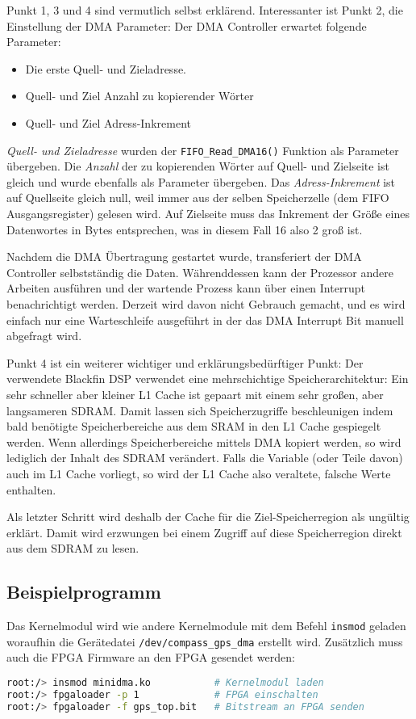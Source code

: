 Punkt 1, 3 und 4 sind vermutlich selbst erklärend. Interessanter ist Punkt 2, die Einstellung der DMA Parameter: Der DMA Controller erwartet folgende Parameter: 
\begin{itemize}
    \item Die erste Quell- und Zieladresse.
    \item Quell- und Ziel Anzahl zu kopierender Wörter
    \item Quell- und Ziel Adress-Inkrement
\end{itemize}

\emph{Quell- und Zieladresse} wurden der \lstinline$FIFO_Read_DMA16()$ Funktion als Parameter übergeben. Die \emph{Anzahl} der zu kopierenden Wörter auf Quell- und Zielseite ist gleich und wurde ebenfalls als Parameter übergeben. Das \emph{Adress-Inkrement} ist auf Quellseite gleich null, weil immer aus der selben Speicherzelle (dem FIFO Ausgangsregister) gelesen wird. Auf Zielseite muss das Inkrement der Größe eines Datenwortes in Bytes entsprechen, was in diesem Fall \SI{16}{\bit} also \SI{2}{\byte} groß ist.

Nachdem die DMA Übertragung gestartet wurde, transferiert der DMA Controller selbstständig die Daten. Währenddessen kann der Prozessor andere Arbeiten ausführen und der wartende Prozess kann über einen Interrupt benachrichtigt werden. Derzeit wird davon nicht Gebrauch gemacht, und es wird einfach nur eine Warteschleife ausgeführt in der das DMA Interrupt Bit manuell abgefragt wird.

Punkt 4 ist ein weiterer wichtiger und erklärungsbedürftiger Punkt: Der verwendete Blackfin DSP verwendet eine mehrschichtige Speicherarchitektur: Ein sehr schneller aber kleiner L1 Cache ist gepaart mit einem sehr großen, aber langsameren SDRAM. Damit lassen sich Speicherzugriffe beschleunigen indem bald benötigte Speicherbereiche aus dem SRAM in den L1 Cache gespiegelt werden. Wenn allerdings Speicherbereiche mittels DMA kopiert werden, so wird lediglich der Inhalt des SDRAM verändert. Falls die Variable (oder Teile davon) auch im L1 Cache vorliegt, so wird der L1 Cache also veraltete, falsche Werte enthalten.

Als letzter Schritt wird deshalb der Cache für die Ziel-Speicherregion als ungültig erklärt. Damit wird erzwungen bei einem Zugriff auf diese Speicherregion direkt aus dem SDRAM zu lesen.


\subsection{Beispielprogramm}\label{BeispielRohdatenAufzeichnen}
Das Kernelmodul wird wie andere Kernelmodule mit dem Befehl \lstinline$insmod$ geladen woraufhin die Gerätedatei \lstinline$/dev/compass_gps_dma$ erstellt wird. Zusätzlich muss auch die FPGA Firmware an den FPGA gesendet werden:
\begin{lstlisting}[language=bash, deletekeywords={if}]
root:/> insmod minidma.ko           # Kernelmodul laden
root:/> fpgaloader -p 1             # FPGA einschalten
root:/> fpgaloader -f gps_top.bit   # Bitstream an FPGA senden
\end{lstlisting}

